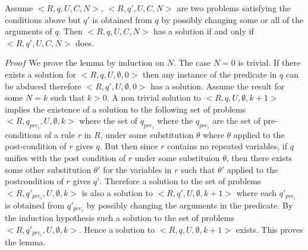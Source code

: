 \documentclass{article}
\begin{document}
\begin{lemma}
Assume $<R,q,U,C,N>$, $<R,q',U,C,N>$ are two problems satisfying the conditions above but $q'$ is obtained from $q$ by possibly changing some or all of the arguments of $q$. Then $<R,q,U,C,N>$ has a solution if and only if $<R,q',U,C,N>$ does.\\
\end{lemma}
$Proof$ We prove the lemma by induction on $N$.
The case $N = 0$ is trivial. If there exists a solution for $<R,q,U,\emptyset,0>$ then any instance of the predicate in $q$ can be abduced therefore $<R,q',U,\emptyset,0>$ has a solution. Assume the result for some $N = k$ such that $k>0$. A non trivial solution to $<R,q,U,\emptyset,k+1>$ implies the existence of a solution to the following set of problems $<R,q_{pre_{i}},U,\emptyset,k>$ where the set of $q_{pre_{i}}$ where the $q_{pre_{i}}$ are the set of pre-conditions of a rule $r$ in $R$, under some substitution $\theta$ where $\theta$ applied to the post-condition of $r$ gives $q$. But then since $r$ contains no repeated variables, if $q$ unifies with the post condition of $r$ under some substituion $\theta$, then there exists some other substitution $\theta'$ for the variables in $r$ such that $\theta'$ applied to the postcondition of $r$ gives $q'$. Therefore a solution to the set of problems $<R,q'_{pre_{i}},U,\emptyset,k>$ is also a solution to $<R,q',U,\emptyset,k+1>$ where each $q'_{pre_{i}}$ is obtained from $q'_{pre_{i}}$ by possibly changing the arguments in the predicate. By the induction hypothesis such a solution to the set of problems $<R,q'_{pre_{i}},U,\emptyset,k>$. Hence a solution to  $<R,q,U,\emptyset,k+1>$ exists. This proves the lemma.\\
\end{document}
